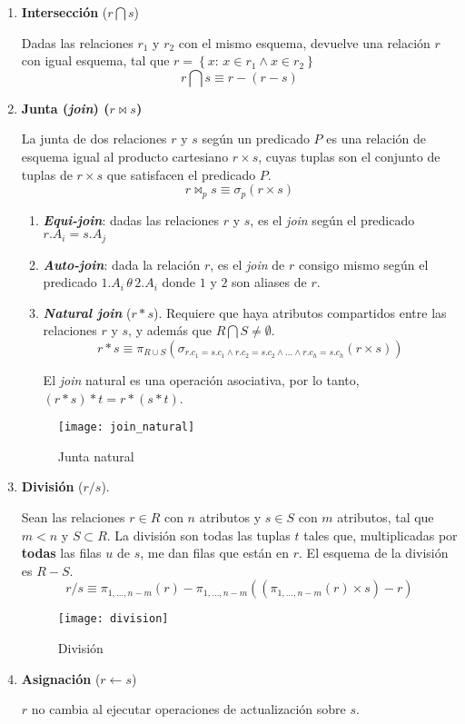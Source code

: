 \documentclass[a4paper, twoside]{article}
\begin{document}
\begin{enumerate}
	\item \textbf{Intersección} ($r\bigcap s$)

	Dadas las relaciones $r_{1}$ y $r_{2}$ con el mismo esquema, devuelve una relación $r$ con igual esquema, tal que $r=\left\{ x:\, x\in r_{1}\wedge x\in r_{2}\right\} $
	\[
		r\bigcap s\equiv r-\left(r-s\right)
	\]

	\item \textbf{Junta (}\textbf{\emph{join}}\textbf{) ($r\bowtie s$)}

	La junta de dos relaciones $r$ y $s$ según un predicado $P$ es una relación de esquema igual al producto cartesiano $r\times s$, cuyas tuplas son el conjunto de tuplas de $r\times s$ que satisfacen
el predicado $P$.
	\[
		r\bowtie_{p}s\equiv\sigma_{p}\left(r\times s\right)
	\]

	\begin{enumerate}
		\item \textbf{\emph{Equi-join}}: dadas las relaciones $r$ y $s$, es el \emph{join} según el predicado $r.A_{i}=s.A_{j}$
		\item \textbf{\emph{Auto-join}}: dada la relación $r$, es el \emph{join} de $r$ consigo mismo según el predicado $1.A_{i}\,\theta\,2.A_{i}$ donde $1$ y $2$ son aliases de $r$.
		\item \textbf{\emph{Natural join}}\textbf{ }($r*s$). Requiere que haya atributos compartidos entre las relaciones $r$ y $s$, y además que $R\bigcap S\neq\emptyset$.
		\[
			r*s \equiv \pi_{R\cup S} \left( \sigma_{r.c_{1} = s.c_{1} \wedge r.c_{2} = s.c_{2} \wedge \dots \wedge r.c_{h} = s.c_{h}} \left( r\times s \right) \right)
		\]

		El \emph{join} natural es una operación asociativa, por lo tanto, $(r*s)*t = r*(s*t)$.
	\end{enumerate}
	
	\begin{figure}[H]
		\centering
		\texttt{[image: join\_natural]}
		\caption{Junta natural}
	\end{figure}

	\item \textbf{División} ($r/s$). 

	Sean las relaciones $r\in R$ con $n$ atributos y $s\in S$ con $m$ atributos, tal que $m<n$ y $S\subset R$. La división son todas las tuplas $t$ tales que, multiplicadas por \textbf{todas} las filas $u$ de $s$, me dan filas que están en $r$. El esquema de la división es $R-S$.
	\[
		r/s\equiv\pi_{1,\dots,n-m}(r)-\pi_{1,\dots,n-m}\left(\left(\pi_{1,\dots,n-m}(r)\times s\right)-r\right)
	\]

	\begin{figure}[H]
		\centering
		\texttt{[image: division]}
		\caption{División}
	\end{figure}

	\item \textbf{Asignación} ($r\leftarrow s$)

	$r$ no cambia al ejecutar operaciones de actualización sobre $s$.
\end{enumerate}
\end{document}
